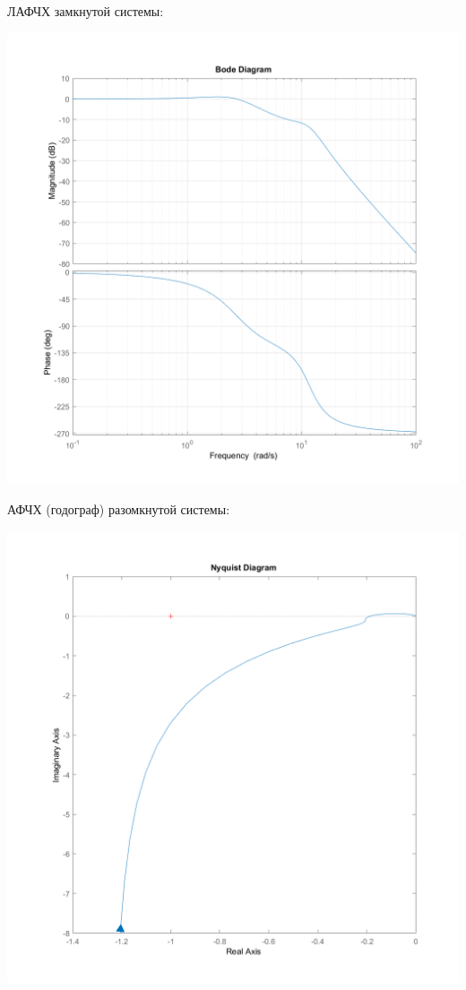 \documentclass[a4paper,12pt]{article}
\renewcommand{\^}[2]{#1^{\, #2} \kern -1pt}
\newcommand{\1}{\kern 1pt}
\newcommand{\0}{\kern -1pt}
\begin{document}
	\newpage
	
	ЛАФЧХ замкнутой системы:
	
	\hspace{-3.0cm}\includegraphics[scale=0.65,page=1]{ЛАФЧХ_3(2.1).png}
	
	\newpage
	
	АФЧХ (годограф) разомкнутой системы:
	
	\includegraphics[scale=0.38,page=1]{АФЧХ_3(1.1).png}
	
\end{document}
